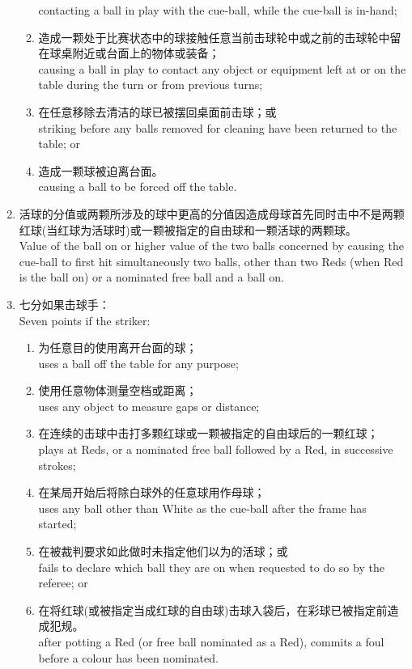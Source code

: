 \begin{enumerate}[label=(\alph*),start=1]
\begin{enumerate}[label=(\roman*)]
        contacting a ball in play with the cue-ball, while the cue-ball is in-hand;
        \item 造成一颗处于比赛状态中的球接触任意当前击球轮中或之前的击球轮中留在球桌附近或台面上的物体或装备；\\
        causing a ball in play to contact any object or equipment left at or on the table during the turn or from previous turns;
        \item 在任意移除去清洁的球已被摆回桌面前击球；或\\
        striking before any balls removed for cleaning have been returned to the table; or
        \item 造成一颗球被迫离台面。\\
        causing a ball to be forced off the table.
    \end{enumerate}
    \item 活球的分值或两颗所涉及的球中更高的分值因造成母球首先同时击中不是两颗红球(当红球为活球时)或一颗被指定的自由球和一颗活球的两颗球。\\
    Value of the ball on or higher value of the two balls concerned by causing the cue-ball to first hit simultaneously two balls, other than two Reds (when Red is the ball on) or a nominated free ball and a ball on.
    \item \label{22311d}七分如果击球手：\\
    Seven points if the striker:
    \begin{enumerate}[label=(\roman*)]
        \item 为任意目的使用离开台面的球；\\
        uses a ball off the table for any purpose;
        \item 使用任意物体测量空档或距离；\\
        uses any object to measure gaps or distance;
        \item 在连续的击球中击打多颗红球或一颗被指定的自由球后的一颗红球；\\
        plays at Reds, or a nominated free ball followed by a Red, in successive strokes;
        \item 在某局开始后将除白球外的任意球用作母球；\\
        uses any ball other than White as the cue-ball after the frame has started;
        \item 在被裁判要求如此做时未指定他们以为的活球；或\\
        fails to declare which ball they are on when requested to do so by the referee; or
        \item 在将红球(或被指定当成红球的自由球)击球入袋后，在彩球已被指定前造成犯规。\\
        after potting a Red (or free ball nominated as a Red), commits a foul before a colour has been nominated.
    \end{enumerate}
\end{enumerate}

